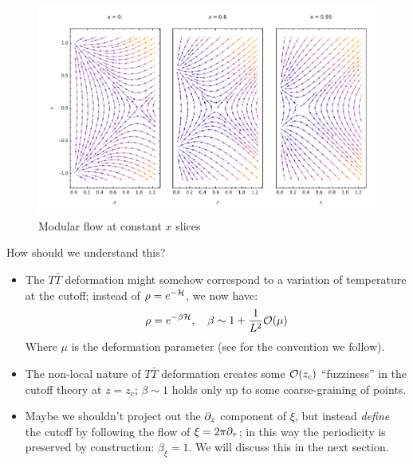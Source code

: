 \documentclass[11pt,a4paper]{article}
\begin{document}
	\begin{figure}[!ht]
	\vspace{-1.5ex}
	\centering
	\includegraphics[width=.8\linewidth]{img/modFlowXsection.pdf}
	\hspace{2em}
	\vspace{-2ex}
	\caption{Modular flow at constant $x$ slices}
	\end{figure}
	
\pagebreak[3]
	
	How should we understand this?
	\begin{itemize}
	\item The $T\bar{T}$ deformation might somehow correspond to a variation of temperature at the cutoff; instead of $\rho = e^{-\mathcal{H}}$, we now have:
	\begin{equation}
		\rho = e^{-\beta\mcal{H}},
	\quad \beta \sim 1 + \frac{1}{L^2} \order{\mu}
	\end{equation}
	Where $\mu$ is the deformation parameter (see \cite{Apolo:2019zai} for the convention we follow). 
	
	\item The non-local nature of $T\bar{T}$ deformation creates some $\order{z_c}$ ``fuzziness'' in the cutoff theory at $z = z_c$; $\beta \sim 1$ holds only up to some coarse-graining of points. 
	
	\item Maybe we shouldn't project out the $\partial_{z}$ component of $\xi$, but instead \textit{define} the cutoff by following the flow of $\xi = 2\pi\partial_{\tau}$; in this way the periodicity is preserved by construction: $\beta_\xi = 1$. We will discuss this in the next section. 
	\end{itemize}
	
\end{document}
